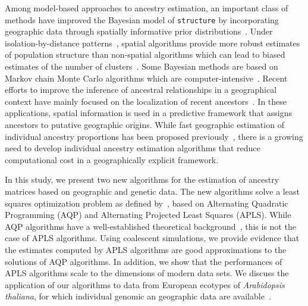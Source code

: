 Among model-based approaches to ancestry estimation, an important class of
methods have improved the Bayesian model of {\tt structure} by incorporating
geographic data through spatially informative prior
distributions~\citep{Chen2007, Corander2008}. Under isolation-by-distance
patterns~\citep{Wright1943, Malecot1948}, spatial algorithms provide more robust
estimates of population structure than non-spatial algorithms which can lead to
biased estimates of the number of clusters~\citep{Durand2009}. Some Bayesian
methods are based on Markov chain Monte Carlo algorithms which are
computer-intensive~\citep{Francois2010}. Recent efforts to improve the inference
of ancestral relationships in a geographical context have mainly focused on the
localization of recent ancestors~\citep{Baran2013, Lao2014, Yang2014,
  bhaskar2016, ranola2014}. In these applications, spatial information is used
in a predictive framework that assigns ancestors to putative geographic origins.
While fast geographic estimation of individual ancestry proportions has been
proposed previously~\citep{Caye2016, bradburd2016}, there is a growing need to
develop individual ancestry estimation algorithms that reduce computational cost
in a geographically explicit framework.

 In this study, we present two new algorithms for the estimation of ancestry
 matrices based on geographic and genetic data. The new algorithms solve a least
 squares optimization problem as defined by~\cite{Caye2016}, based on
 Alternating Quadratic Programming (AQP) and Alternating Projected Least Squares
 (APLS). While AQP algorithms have a well-established theoretical
 background~\citep{Bertsekas1995}, this is not the case of APLS algorithms.
 Using coalescent simulations, we provide evidence that the estimates computed
 by APLS algorithms are good approximations to the solutions of AQP algorithms.
 In addition, we show that the performances of APLS algorithms scale to the
 dimensions of modern data sets. We discuss the application of our algorithms to
 data from European ecotypes of {\it Arabidopsis thaliana}, for which individual
 genomic an geographic data are available~\citep{Horton2012}.




